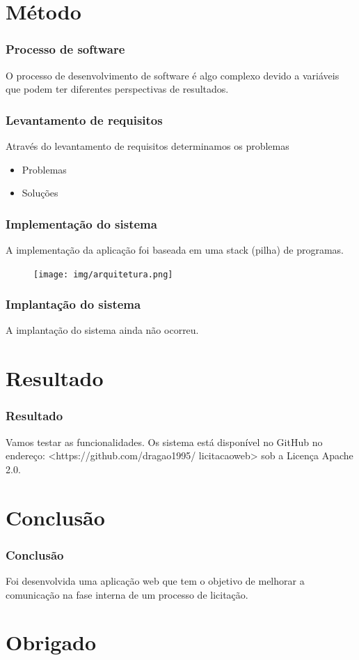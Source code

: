 \documentclass{beamer}
\begin{document}
	\section{Método}
	
		\begin{frame}\frametitle{Processo de software}
			
			O processo de desenvolvimento de software é algo complexo devido a variáveis que podem ter diferentes perspectivas de resultados.
		\end{frame}
	
		\begin{frame}\frametitle{Levantamento de requisitos}
			Através do levantamento de requisitos determinamos os problemas
			\begin{itemize}
				\item Problemas
				\item Soluções
			\end{itemize}
		\end{frame}
	
		\begin{frame}\frametitle{Implementação do sistema}
			A implementação da aplicação foi baseada em uma stack (pilha) de programas.
			\begin{figure}[ht]
				\centering
				\texttt{[image: img/arquitetura.png]}
			\end{figure}
		\end{frame}
	
		\begin{frame}\frametitle{Implantação do sistema}
			A implantação do sistema ainda não ocorreu.
		\end{frame}
	
	\section{Resultado}
		
		\begin{frame}\frametitle{Resultado}
			Vamos testar as funcionalidades.
			Os sistema está disponível no GitHub no endereço: <https://github.com/dragao1995/
			licitacaoweb> sob a Licença Apache 2.0.
		\end{frame}

	\section{Conclusão}
	
		\begin{frame}\frametitle{Conclusão}
			Foi desenvolvida uma aplicação web que tem o objetivo de melhorar a comunicação na fase interna de um processo de licitação.
		\end{frame}	
	
	\section{Obrigado}
		
\end{document}
